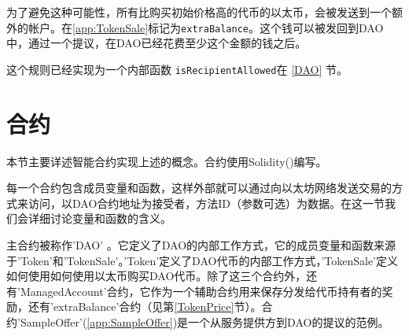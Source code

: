 \documentclass[9pt,oneside]{amsart}
\begin{document}
\begin{multicols}{2}
为了避免这种可能性，所有比购买初始价格高的代币的以太币，会被发送到一个额外的帐户。在\ref{app:TokenSale}标记为\verb|extraBalance|。这个钱可以被发回到DAO中，通过一个提议，在DAO已经花费至少这个金额的钱之后。

这个规则已经实现为一个内部函数 \verb|isRecipientAllowed|在 \ref{DAO} 节。

\section{合约}

本节主要详述智能合约实现上述的概念。合约使用Solidity(\cite{ReitwiessnerWoodSolidity})编写。

每一个合约包含成员变量和函数，这样外部就可以通过向以太坊网络发送交易的方式来访问，以DAO合约地址为接受者，方法ID（参数可选）为数据。在这一节我们会详细讨论变量和函数的含义。

主合约被称作'DAO' 。它定义了DAO的内部工作方式，它的成员变量和函数来源于'Token'和'TokenSale'。'Token'定义了DAO代币的内部工作方式，'TokenSale'定义如何使用如何使用以太币购买DAO代币。除了这三个合约外，还有'ManagedAccount'合约，它作为一个辅助合约用来保存分发给代币持有者的奖励，还有'extraBalance'合约（见第\ref{TokenPrice}节）。合约'SampleOffer'(\ref{app:SampleOffer})是一个从服务提供方到DAO的提议的范例。
\end{multicols}
\end{document}
